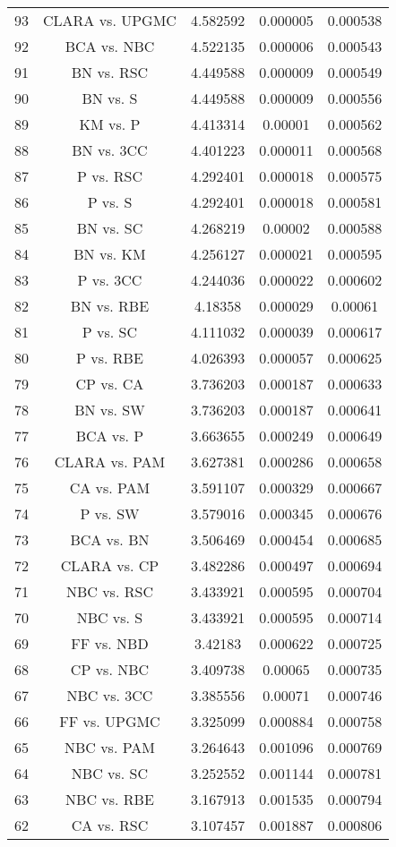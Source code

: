 \documentclass[a4paper,10pt]{article}
\begin{document}
\begin{landscape}
\begin{table}[!htp]
\begin{tabular}{ccccc}
93&CLARA vs. UPGMC&4.582592&0.000005&0.000538\\
92&BCA vs. NBC&4.522135&0.000006&0.000543\\
91&BN vs. RSC&4.449588&0.000009&0.000549\\
90&BN vs. S&4.449588&0.000009&0.000556\\
89&KM vs. P&4.413314&0.00001&0.000562\\
88&BN vs. 3CC&4.401223&0.000011&0.000568\\
87&P vs. RSC&4.292401&0.000018&0.000575\\
86&P vs. S&4.292401&0.000018&0.000581\\
85&BN vs. SC&4.268219&0.00002&0.000588\\
84&BN vs. KM&4.256127&0.000021&0.000595\\
83&P vs. 3CC&4.244036&0.000022&0.000602\\
82&BN vs. RBE&4.18358&0.000029&0.00061\\
81&P vs. SC&4.111032&0.000039&0.000617\\
80&P vs. RBE&4.026393&0.000057&0.000625\\
79&CP vs. CA&3.736203&0.000187&0.000633\\
78&BN vs. SW&3.736203&0.000187&0.000641\\
77&BCA vs. P&3.663655&0.000249&0.000649\\
76&CLARA vs. PAM&3.627381&0.000286&0.000658\\
75&CA vs. PAM&3.591107&0.000329&0.000667\\
74&P vs. SW&3.579016&0.000345&0.000676\\
73&BCA vs. BN&3.506469&0.000454&0.000685\\
72&CLARA vs. CP&3.482286&0.000497&0.000694\\
71&NBC vs. RSC&3.433921&0.000595&0.000704\\
70&NBC vs. S&3.433921&0.000595&0.000714\\
69&FF vs. NBD&3.42183&0.000622&0.000725\\
68&CP vs. NBC&3.409738&0.00065&0.000735\\
67&NBC vs. 3CC&3.385556&0.00071&0.000746\\
66&FF vs. UPGMC&3.325099&0.000884&0.000758\\
65&NBC vs. PAM&3.264643&0.001096&0.000769\\
64&NBC vs. SC&3.252552&0.001144&0.000781\\
63&NBC vs. RBE&3.167913&0.001535&0.000794\\
62&CA vs. RSC&3.107457&0.001887&0.000806\\

\end{tabular}
\end{table}
\end{landscape}
\end{document}
